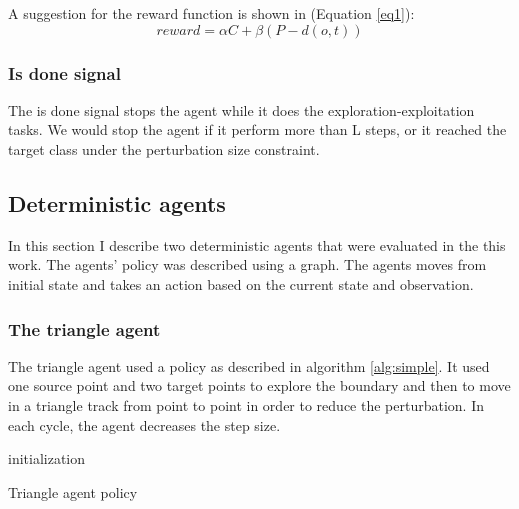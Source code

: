 \documentclass{article}
\begin{document}
A suggestion for the reward function is shown in (Equation \ref{eq1}):
\begin{equation} \label{eq1}
reward = \alpha C + \beta  \left (P-d\left ( o, t \right )  \right )
\end{equation}

\subsubsection{Is done signal}
The is done signal stops the agent while it does the exploration-exploitation tasks. We would stop the agent if it perform more than L steps, or it reached the target class under the perturbation size constraint.

\subsection{Deterministic agents}
In this section I describe two deterministic agents that were evaluated in the this work. The agents' policy was described using a graph. The agents moves from initial state and takes an action based on the current state and observation.


\subsubsection{The triangle agent}
The triangle agent used a policy as described in algorithm \ref{alg:simple}. It used one source point and two target points to explore the boundary and then to move in a triangle track from point to point in order to reduce the perturbation. In each cycle, the agent decreases the step size.

\begin{algorithm}[H] \label{alg:simple}
\SetAlgoLined
{}
 initialization\;
 \caption{Triangle agent policy}
\end{algorithm}
\end{document}
